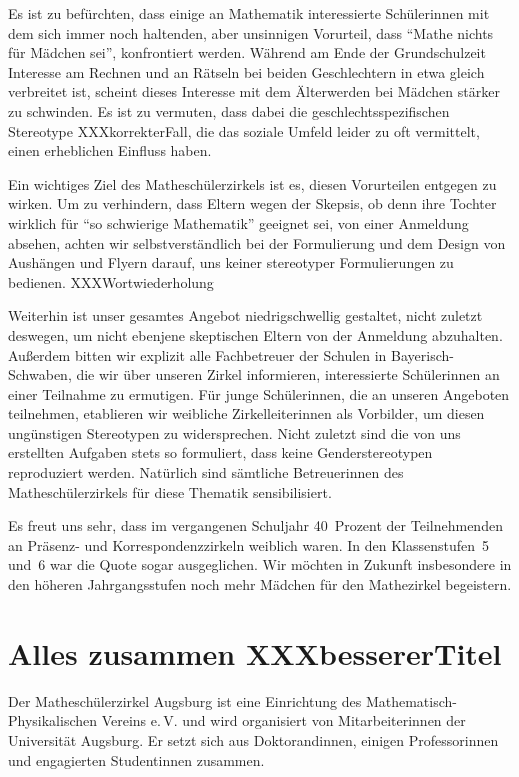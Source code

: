 \documentclass[12pt]{zettel}
\begin{document}
Es ist zu befürchten, dass einige an Mathematik interessierte Schülerinnen mit dem sich immer noch haltenden, aber unsinnigen Vorurteil, dass "`Mathe nichts für Mädchen sei"',
konfrontiert werden. Während am Ende der Grundschulzeit Interesse am Rechnen und an Rätseln bei beiden Geschlechtern in etwa gleich verbreitet ist, scheint dieses Interesse mit
dem Älterwerden bei Mädchen stärker zu schwinden. Es ist zu vermuten, dass dabei die geschlechtsspezifischen Stereotype XXXkorrekterFall, die das soziale Umfeld leider zu oft vermittelt, einen
erheblichen Einfluss haben.

Ein wichtiges Ziel des Matheschülerzirkels ist es, diesen Vorurteilen entgegen zu wirken. Um zu verhindern, dass Eltern wegen der Skepsis, ob denn ihre
Tochter wirklich für "`so schwierige Mathematik"' geeignet sei, von einer Anmeldung absehen, achten wir selbstverständlich bei der Formulierung und dem Design von Aushängen und Flyern
darauf, uns keiner stereotyper Formulierungen zu bedienen. XXXWortwiederholung

Weiterhin ist unser gesamtes Angebot niedrigschwellig gestaltet, nicht zuletzt deswegen, um nicht ebenjene skeptischen Eltern
von der Anmeldung abzuhalten. Außerdem bitten wir explizit alle Fachbetreuer der Schulen in Bayerisch-Schwaben, die wir über unseren Zirkel informieren, interessierte Schülerinnen an
einer Teilnahme zu ermutigen. Für junge Schülerinnen, die an unseren Angeboten teilnehmen, etablieren wir weibliche Zirkelleiterinnen als Vorbilder, um diesen ungünstigen Stereotypen zu
widersprechen. Nicht zuletzt sind die von uns erstellten Aufgaben stets so formuliert, dass keine Genderstereotypen reproduziert werden. Natürlich sind sämtliche Betreuerinnen des
Matheschülerzirkels für diese Thematik sensibilisiert.

Es freut uns sehr, dass im vergangenen Schuljahr
40~Prozent der Teilnehmenden an Präsenz- und Korrespondenzzirkeln weiblich waren. In den Klassenstufen~5 und~6 war die Quote sogar ausgeglichen. Wir möchten in Zukunft insbesondere
in den höheren Jahrgangsstufen noch mehr Mädchen für den Mathezirkel begeistern.


\section{Alles zusammen XXXbessererTitel}

Der Matheschülerzirkel Augsburg ist eine Einrichtung des
Mathematisch-Phy\-si\-ka\-li\-schen Vereins e.\,V. und wird organisiert von
Mitarbeiterinnen der Universität
Augsburg. Er setzt sich aus Doktorandinnen,
einigen Professorinnen und engagierten Studentinnen zusammen.
\end{document}
